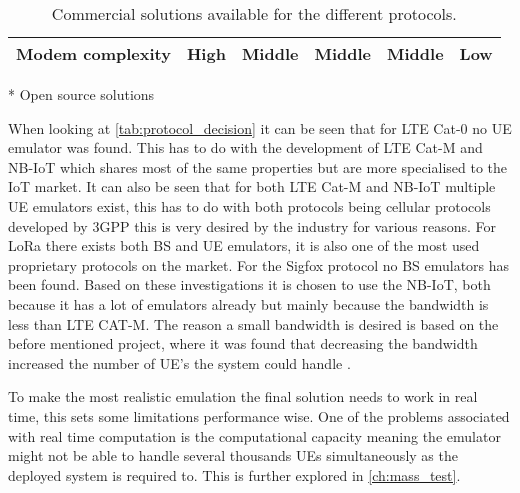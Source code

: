 \begin{table}[H]
{\begin{tabular}{|c|c|c|c|c|c|}
Modem complexity	& High 				& Middle 				& Middle 			& Middle 		& Low				\\ \hline
\end{tabular}}
\raggedright \scriptsize{ * Open source solutions} 
\caption{Commercial solutions available for the different protocols. \citep{UE_list, Amarisoft_solutions, SRS_solutions, LORA_solutions, Things_solutions, Mira_solutions, Telit_solutions, telefonicaid_solutions, murata_solutions}}%
\label{tab:protocol_decision}
\end{table}


When looking at \autoref{tab:protocol_decision} it can be seen that for \gls{LTE} Cat-0 no \gls{UE} emulator was found. This has to do with the development of \gls{LTE} Cat-M and \gls{NB-IoT} which shares most of the same properties but are more specialised to the \gls{IoT} market. It can also be seen that for both \gls{LTE} Cat-M and \gls{NB-IoT} multiple \gls{UE} emulators exist, this has to do with both protocols being cellular protocols developed by \gls{3GPP} this is very desired by the industry for various reasons. For \gls{LoRa} there exists both  \gls{BS} and \gls{UE} emulators, it is also one of the most used proprietary protocols on the market. For the Sigfox protocol no \gls{BS} emulators has been found. Based on these investigations it is chosen to use the \gls{NB-IoT}, both because it has a lot of emulators already but mainly because the bandwidth is less than LTE CAT-M. The reason a small bandwidth is desired is based on the before mentioned project, where it was found that decreasing the bandwidth increased the number of UE's the system could handle \citep{thesis_report}. 


To make the most realistic emulation the final solution needs to work in real time, this sets some limitations performance wise. One of the problems associated with real time computation is the computational capacity meaning the emulator might not be able to handle several thousands \gls{UE}s simultaneously as the deployed system is required to. This is further explored in \autoref{ch:mass_test}.

